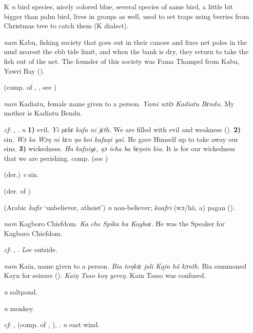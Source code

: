 \begin{letter}{K}
 \textit{n} bird species, nicely colored blue, several species of same bird, a little bit bigger than palm bird, lives in groups as well, used to set traps using berries from Christmas tree to catch them (K dialect). 

 \textit{nam} Kabu, fishing society that goes out in their canoes and fixes net poles in the mud nearest the ebb tide limit, and when the bank is dry, they return to take the fish out of the net. The founder of this society was Fama Thampel from Kabu, Yawri Bay (\citealt{Pichl1967}). 

 (comp. of , , see ) 

 \textit{nam} Kadiatu, female name given to a person. \textit{Yami wɔlɔ Kadiatu Bɛndu.} My mother is Kadiatu Bendu.

 \textit{cf}: , . \textit{n} \textbf{1)} evil. \textit{Yi pɛkɛ kafa ni jɛth.} We are filled with evil and weakness (\citealt{Pichl1967}). \textbf{2)} sin. \textit{Wɔ ka Wɔŋ ni kɛn ŋa koi kafaŋi yai.} He gave Himself up to take away our sins. \textbf{3)} wickedness. \textit{Ha kafaiyɛ, ŋɔ icha ba bɛŋsin kia.} It is for our wickedness that we are perishing. comp.  (see )

 (der.) \textit{v} sin.

 (der. of ) 

 (Arabic { } \textit{kafir} ‘unbeliever, atheist') \textit{n} non-believer; \textit{kaafri} (wɔ/hã, a) pagan (\citealt{Pichl1967}).

 \textit{nam} Kagboro Chiefdom. \textit{Ka che Spika ha Kagboɛ.} He was the Speaker for Kagboro Chiefdom.

 \textit{cf}: , . \textit{Loc} outside.

 \textit{nam} Kain, name given to a person. \textit{Bia toŋkiɛ jali Ka̰ḭn hã kɔnth.} Bia summoned Kayn for seizure (\citealt{Pichl1967}). \textit{Kaiŋ Taso koŋ yereŋ.}
Kain Tasso was confused.

 \textit{n} saltpond.

 \textit{n} monkey.

 \textit{cf}: ,  (comp. of , ), . \textit{n} east wind.


\end{letter}
